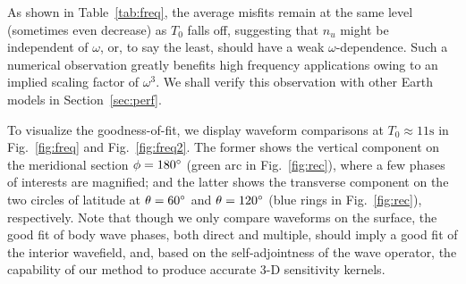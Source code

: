 \documentclass[extra]{gji}
\begin{document}
As shown in Table~\ref{tab:freq}, the average misfits remain at the same 
level (sometimes even decrease) as $T_0$ falls off, 
suggesting that $n_u$ might be independent of
$\omega$, or, to say the least, should have a weak $\omega$-dependence. 
Such a numerical observation greatly benefits high frequency applications
owing to an implied scaling factor of $\omega^3$. 
We shall verify this observation with other Earth models 
in Section~\ref{sec:perf}. 

To visualize the goodness-of-fit, we display waveform comparisons
at $T_0\approx11\text{s}$ in Fig.~\ref{fig:freq} and Fig.~\ref{fig:freq2}. 
The former shows the vertical component on the meridional section $\phi=180\hbox{$^\circ$}$
(green arc in Fig.~\ref{fig:rec}),
where a few phases of interests are magnified; 
and the latter shows the transverse component on the two 
circles of latitude at $\theta=60\hbox{$^\circ$}$ and $\theta=120\hbox{$^\circ$}$
(blue rings in Fig.~\ref{fig:rec}), respectively. 
Note that though we only compare waveforms on the surface,
the good fit of body wave phases, both direct and multiple, should imply 
a good fit of the interior wavefield, and, based on the self-adjointness 
of the wave operator, the capability of our method to produce 
accurate 3-D sensitivity kernels. 
\end{document}
